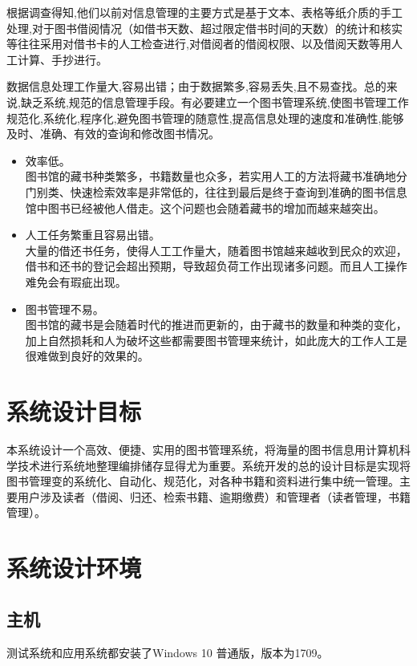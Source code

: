 \documentclass[forprint]{shmtu}
\begin{document}
根据调查得知,他们以前对信息管理的主要方式是基于文本、表格等纸介质的手工处理,对于图书借阅情况（如借书天数、超过限定借书时间的天数）的统计和核实等往往采用对借书卡的人工检查进行,对借阅者的借阅权限、以及借阅天数等用人工计算、手抄进行。

数据信息处理工作量大,容易出错；由于数据繁多,容易丢失,且不易查找。总的来说,缺乏系统,规范的信息管理手段。有必要建立一个图书管理系统,使图书管理工作规范化,系统化,程序化,避免图书管理的随意性,提高信息处理的速度和准确性,能够及时、准确、有效的查询和修改图书情况。
\\
\begin{itemize}
	\item 效率低。\\图书馆的藏书种类繁多，书籍数量也众多，若实用人工的方法将藏书准确地分门别类、快速检索效率是非常低的，往往到最后是终于查询到准确的图书信息馆中图书已经被他人借走。这个问题也会随着藏书的增加而越来越突出。
	\item 人工任务繁重且容易出错。\\大量的借还书任务，使得人工工作量大，随着图书馆越来越收到民众的欢迎，借书和还书的登记会超出预期，导致超负荷工作出现诸多问题。而且人工操作难免会有瑕疵出现。
	\item 图书管理不易。\\图书馆的藏书是会随着时代的推进而更新的，由于藏书的数量和种类的变化，加上自然损耗和人为破坏这些都需要图书管理来统计，如此庞大的工作人工是很难做到良好的效果的。
\end{itemize}

\section{系统设计目标}

本系统设计一个高效、便捷、实用的图书管理系统，将海量的图书信息用计算机科学技术进行系统地整理编排储存显得尤为重要。系统开发的总的设计目标是实现将图书管理变的系统化、自动化、规范化，对各种书籍和资料进行集中统一管理。主要用户涉及读者（借阅、归还、检索书籍、逾期缴费）和管理者（读者管理，书籍管理）。

\section{系统设计环境}

\subsection{主机}

测试系统和应用系统都安装了Windows 10 普通版，版本为1709。
\end{document}
